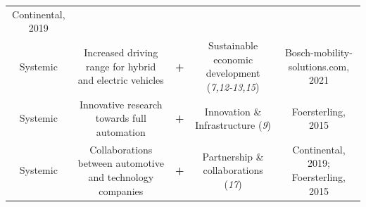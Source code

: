 \documentclass[
]{book}
\begin{document}
\begin{longtable}[]{@{}ccccc@{}}
\begin{minipage}[t]{0.17\columnwidth}
Continental, 2019\strut
\end{minipage}\tabularnewline
\begin{minipage}[t]{0.17\columnwidth}\centering
Systemic\strut
\end{minipage} & \begin{minipage}[t]{0.16\columnwidth}\centering
Increased driving range for hybrid and electric vehicles\strut
\end{minipage} & \begin{minipage}[t]{0.17\columnwidth}\centering
\textbf{+}\strut
\end{minipage} & \begin{minipage}[t]{0.17\columnwidth}\centering
Sustainable economic development (\emph{7,12-13,15})\strut
\end{minipage} & \begin{minipage}[t]{0.17\columnwidth}\centering
Bosch-mobility-solutions.com, 2021\strut
\end{minipage}\tabularnewline
\begin{minipage}[t]{0.17\columnwidth}\centering
Systemic\strut
\end{minipage} & \begin{minipage}[t]{0.16\columnwidth}\centering
Innovative research towards full automation\strut
\end{minipage} & \begin{minipage}[t]{0.17\columnwidth}\centering
\textbf{+}\strut
\end{minipage} & \begin{minipage}[t]{0.17\columnwidth}\centering
Innovation \& Infrastructure (\emph{9})\strut
\end{minipage} & \begin{minipage}[t]{0.17\columnwidth}\centering
Foersterling, 2015\strut
\end{minipage}\tabularnewline
\begin{minipage}[t]{0.17\columnwidth}\centering
Systemic\strut
\end{minipage} & \begin{minipage}[t]{0.16\columnwidth}\centering
Collaborations between automotive and technology companies\strut
\end{minipage} & \begin{minipage}[t]{0.17\columnwidth}\centering
\textbf{+}\strut
\end{minipage} & \begin{minipage}[t]{0.17\columnwidth}\centering
Partnership \& collaborations (\emph{17})\strut
\end{minipage} & \begin{minipage}[t]{0.17\columnwidth}\centering
Continental, 2019; Foersterling, 2015\strut
\end{minipage}\tabularnewline
\bottomrule
\end{longtable}
\end{document}
